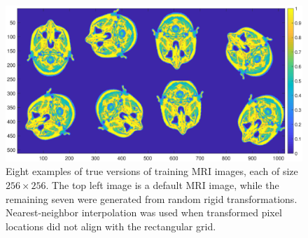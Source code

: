 \documentclass[12pt]{article}
\begin{document}
\begin{figure}[ht]
\includegraphics[scale=0.36]{Figures/MRI_Transformations}
\caption{Eight examples of true versions of training MRI images, each of size $256 \times 256$. The top left image is a default MRI image, while the remaining seven were generated from random rigid transformations. Nearest-neighbor interpolation was used when transformed pixel locations did not align with the rectangular grid.}
\label{fig:MRI Transformations}
\end{figure}
\end{document}
